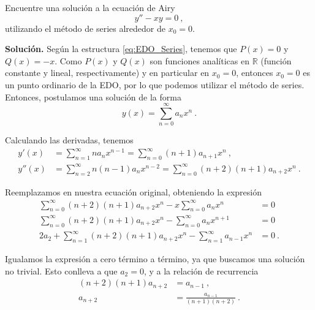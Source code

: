 \begin{ejemplo}
    Encuentre una solución a la ecuación de Airy
    \begin{equation}
        y'' - xy = 0 \ ,
    \end{equation}
    utilizando el método de series alrededor de $x_0 = 0$.

    \textbf{Solución.} Según la estructura \eqref{eq:EDO_Series}, tenemos que $P(x) = 0$ y $Q(x) = -x$. Como $P(x)$ y $Q(x)$ son funciones analíticas en $\mathbb{R}$ (función constante y lineal, respectivamente) y en particular en $x_0 = 0$, entonces $x_0 = 0$ es un punto ordinario de la EDO, por lo que podemos utilizar el método de series. Entonces, postulamos una solución de la forma
    \begin{equation}
        y(x) = \sum_{n=0}^\infty a_n x^n \ .
    \end{equation}

    Calculando las derivadas, tenemos
    \begin{align}
        y'(x)  & = \sum_{n=1}^\infty na_n x^{n-1} = \sum_{n=0}^\infty (n+1) a_{n+1} x^n \ , \\
        y''(x) & = \sum_{n=2}^\infty n(n-1) a_n x^{n-2} = \sum_{n=0}^\infty (n+2) (n+1) a_{n+2} x^n \ .
    \end{align}

    Reemplazamos en nuestra ecuación original, obteniendo la expresión 
    \begin{align}
        \sum_{n=0}^\infty (n+2) (n+1) a_{n+2} x^n - x \sum_{n=0}^\infty a_n x^n & = 0 \\
        \sum_{n=0}^\infty (n+2) (n+1) a_{n+2} x^n - \sum_{n=0}^\infty a_n x^{n+1} & = 0 \\
        2a_2 + \sum_{n=1}^\infty (n+2) (n+1) a_{n+2} x^n - \sum_{n=1}^\infty a_{n-1} x^{n} & = 0 \ .
    \end{align}

    Igualamos la expresión a cero término a término, ya que buscamos una solución no trivial. Esto conlleva a que $a_2 = 0$, y a la relación de recurrencia
    \begin{align}
        (n+2)(n+1) a_{n+2} & = a_{n-1} \ , \\
        a_{n+2} & = \frac{a_{n-1}}{(n+1)(n+2)} \ .
    \end{align}


\end{ejemplo}
